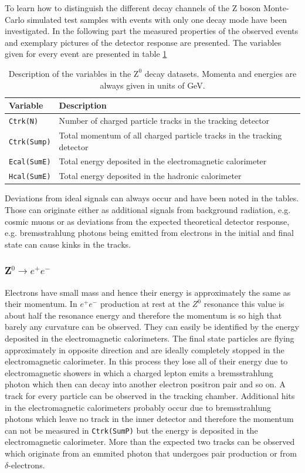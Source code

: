 \documentclass[11pt, a4paper]{article}
\numberwithin{equation}{section}
\begin{document}
To learn how to distinguish the different decay channels of the Z boson Monte-Carlo simulated test samples with events with only one decay mode have been investigated.
In the following part the measured properties of the observed events and exemplary pictures of the detector response are presented.
The variables given for every event are presented in table \ref{tab:desc_variables_tag1}
\begin{table}[H]
	\centering
	\begin{tabularx}{0.9\textwidth}{lX}
		\toprule
		\textbf{Variable} & \textbf{Description} \\
		\midrule		
		\texttt{Ctrk(N)} 	& Number of charged particle tracks in the tracking detector \\
		\texttt{Ctrk(Sump)} 	& Total momentum of all charged particle tracks in the tracking detector \\
		\texttt{Ecal(SumE)}	& Total energy deposited in the electromagnetic calorimeter \\
		\texttt{Hcal(SumE)}	& Total energy deposited in the hadronic calorimeter \\
		\bottomrule
	\end{tabularx}
	\caption{Description of the variables in the $\mathrm{Z}^0$ decay datasets. Momenta and energies are always given in units of GeV.}
	\label{tab:desc_variables_tag1}
\end{table}
Deviations from ideal signals can always occur and have been noted in the tables.
Those can originate either as additional signals from background radiation, e.g. cosmic muons or as deviations from the expected theoretical detector response, e.g. bremsstrahlung photons being emitted from electrons in the initial and final state can cause kinks in the tracks.

\clearpage
\subsubsection{Z$^0\rightarrow e^+e^-$}
Electrons have small mass and hence their energy is approximately the same as their momentum.
In $e^+e^-$ production at rest at the $Z^0$ resonance this value is about half the resonance energy and therefore the momentum is so high that barely any curvature can be observed.
They can easily be identified by the energy deposited in the electromagnetic calorimeters.
The final state particles are flying approximately in opposite direction and are ideally completely stopped in the electromagnetic calorimeter.
In this process they lose all of their energy due to electromagnetic showers in which a charged lepton emits a bremsstrahlung photon which then can decay into another electron positron pair and so on.
A track for every particle can be observed in the tracking chamber.
Additional hits in the electromagnetic calorimeters probably occur due to bremsstrahlung photons which leave no track in the inner detector and therefore the momentum can not be measured in \texttt{Ctrk(SumP)} but the energy is deposited in the electromagnetic calorimeter.
More than the expected two tracks can be observed which originate from an emmited photon that undergoes pair production or from $\delta$-electrons.
\end{document}
